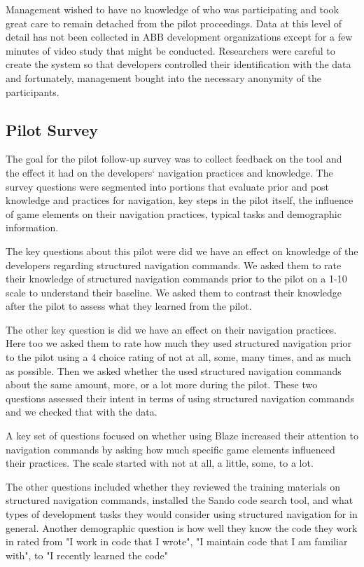 \documentclass{sig-alternate}
\begin{document}
Management wished to have no knowledge of who was participating and took great care to remain detached from the pilot proceedings.  Data at this level of detail has not been collected in ABB development organizations except for a few minutes of video study that might be conducted.  Researchers were careful to create the system so that developers controlled their identification with the data and fortunately, management bought into the necessary anonymity of the participants.
\subsection{Pilot Survey}

The goal for the pilot follow-up survey was to collect feedback on the tool and the effect it had on the developers` navigation practices and knowledge.  The survey questions were segmented into portions that evaluate prior and post knowledge and practices for navigation, key steps in the pilot itself, the influence of game elements on their navigation practices, typical tasks and demographic information.

The key questions about this pilot were did we have an effect on knowledge of the developers regarding structured navigation commands.  We asked them to rate their knowledge of structured navigation commands prior to the pilot on a 1-10 scale to understand their baseline.  We asked them to contrast their knowledge after the pilot to assess what they learned from the pilot.

The other key question is did we have an effect on their navigation practices.  Here too we asked them to rate how much they used structured navigation prior to the pilot using a 4 choice rating of not at all, some, many times, and as much as possible.  Then we asked whether the used structured navigation commands about the same amount, more,  or a lot more during the pilot.  These two questions assessed their intent in terms of using structured navigation commands and we checked that with the data.

A key set of questions focused on whether using Blaze increased their attention to navigation commands by asking how much specific game elements influenced their practices.  The scale started with not at all, a little, some, to a lot.  

The other questions included whether they reviewed the training materials on structured navigation commands, installed the Sando code search tool, and what types of development tasks they would consider using structured navigation for in general.  Another demographic question is how well they know the code they work in rated from "I work in code that I wrote", "I maintain code that I am familiar with", to "I recently learned the code"
\end{document}
